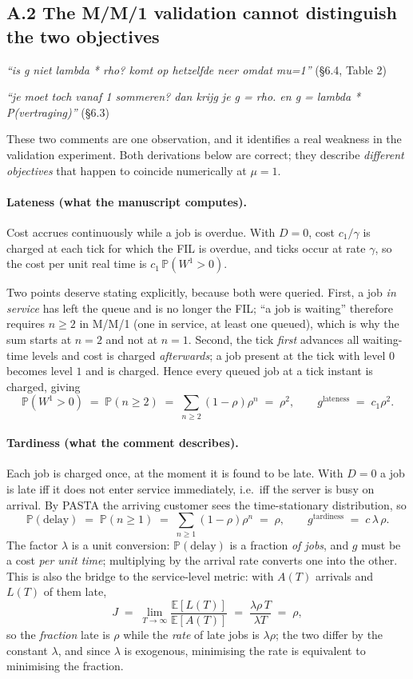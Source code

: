 \documentclass[11pt,a4paper]{article}
\newcommand{\E}{\mathbb{E}}
\newcommand{\Prob}{\mathbb{P}}
\newcommand{\comment}[1]{\textcolor{red!70!black}{\textit{``#1''}}}
\begin{document}
\subsection*{A.2 The M/M/1 validation cannot distinguish the two objectives}

\comment{is g niet lambda * rho? komt op hetzelfde neer omdat mu=1}
\hfill (\S6.4, Table 2)

\comment{je moet toch vanaf 1 sommeren? dan krijg je g = rho. en g = lambda *
P(vertraging)} \hfill (\S6.3)

These two comments are one observation, and it identifies a real weakness in
the validation experiment.  Both derivations below are correct; they describe
\emph{different objectives} that happen to coincide numerically at $\mu = 1$.

\paragraph{Lateness (what the manuscript computes).}
Cost accrues continuously while a job is overdue.  With $D = 0$, cost $c_1/\gamma$
is charged at each tick for which the FIL is overdue, and ticks occur at rate
$\gamma$, so the cost per unit real time is $c_1\,\Prob(W^1 > 0)$.

Two points deserve stating explicitly, because both were queried.  First, a job
\emph{in service} has left the queue and is no longer the FIL; ``a job is
waiting'' therefore requires $n \ge 2$ in M/M/1 (one in service, at least one
queued), which is why the sum starts at $n = 2$ and not at $n = 1$.  Second,
the tick \emph{first} advances all waiting-time levels and cost is charged
\emph{afterwards}; a job present at the tick with level $0$ becomes level $1$
and is charged.  Hence every queued job at a tick instant is charged, giving
\[
  \Prob(W^1 > 0) \;=\; \Prob(n \ge 2) \;=\; \sum_{n\ge2}(1-\rho)\rho^n
  \;=\; \rho^2,
  \qquad
  g^{\text{lateness}} \;=\; c_1\rho^2 .
\]

\paragraph{Tardiness (what the comment describes).}
Each job is charged once, at the moment it is found to be late.  With $D = 0$ a
job is late iff it does not enter service immediately, i.e.\ iff the server is
busy on arrival.  By PASTA the arriving customer sees the time-stationary
distribution, so
\[
  \Prob(\text{delay}) \;=\; \Prob(n \ge 1) \;=\; \sum_{n\ge1}(1-\rho)\rho^n \;=\;\rho ,
  \qquad
  g^{\text{tardiness}} \;=\; c\,\lambda\,\rho .
\]
The factor $\lambda$ is a unit conversion: $\Prob(\text{delay})$ is a fraction
\emph{of jobs}, and $g$ must be a cost \emph{per unit time}; multiplying by the
arrival rate converts one into the other.  This is also the bridge to the
service-level metric: with $A(T)$ arrivals and $L(T)$ of them late,
\[
  J \;=\; \lim_{T\to\infty}\frac{\E[L(T)]}{\E[A(T)]}
  \;=\; \frac{\lambda\rho\,T}{\lambda T} \;=\; \rho ,
\]
so the \emph{fraction} late is $\rho$ while the \emph{rate} of late jobs is
$\lambda\rho$; the two differ by the constant $\lambda$, and since $\lambda$ is
exogenous, minimising the rate is equivalent to minimising the fraction.
\end{document}
